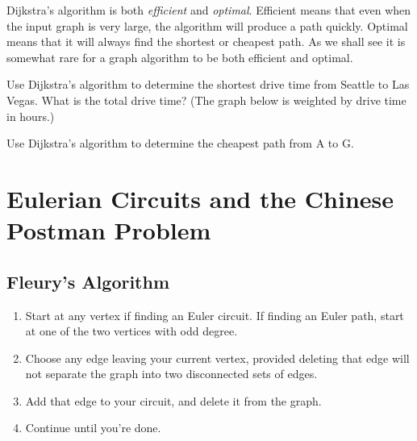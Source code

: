 \begin{note}
  Dijkstra's algorithm is both \emph{efficient} and \emph{optimal}.
  Efficient means that even when the input graph is very large, the
  algorithm will produce a path quickly. Optimal means that it will
  always find the shortest or cheapest path. As we shall see it is
  somewhat rare for a graph algorithm to be both efficient and
  optimal.
\end{note}

\newpage

\begin{exercise}
  Use Dijkstra's algorithm to determine the shortest drive time from
  Seattle to Las Vegas. What is the total drive time? (The graph below
  is weighted by drive time in hours.)

  \bigskip

  

\end{exercise}

\newpage

\begin{exercise}
  Use Dijkstra's algorithm to determine the cheapest path from
  A to G.

  \bigskip

  

\end{exercise}

\newpage

\section{Eulerian Circuits and the Chinese Postman Problem}%
\label{sec:eulerian-circuits}

\subsection{Fleury's Algorithm}%
\label{sub:Fleury's Algorithm}

\begin{algorithm}
  \begin{enumerate}
  \item Start at any vertex if finding an Euler circuit. If finding an
    Euler path, start at one of the two vertices with odd degree.
  \item Choose any edge leaving your current vertex, provided deleting
    that edge will not separate the graph into two disconnected sets
    of edges.
  \item Add that edge to your circuit, and delete it from the graph.
  \item Continue until you're done.
  \end{enumerate}
\end{algorithm}

